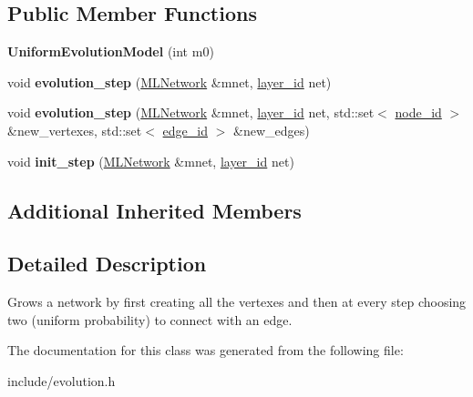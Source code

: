 \subsection*{Public Member Functions}
\begin{DoxyCompactItemize}
\item 
\hypertarget{classmlnet_1_1_uniform_evolution_model_a9686b3e7b297645a5864c6bf5bd167a3}{{\bfseries Uniform\+Evolution\+Model} (int m0)}\label{classmlnet_1_1_uniform_evolution_model_a9686b3e7b297645a5864c6bf5bd167a3}

\item 
\hypertarget{classmlnet_1_1_uniform_evolution_model_ae71cabef018c2465c0d1a54ff181002d}{void {\bfseries evolution\+\_\+step} (\hyperlink{classmlnet_1_1_m_l_network}{M\+L\+Network} \&mnet, \hyperlink{namespacemlnet_a84ad9c6056f0eb7d129995351f9b13fb}{layer\+\_\+id} net)}\label{classmlnet_1_1_uniform_evolution_model_ae71cabef018c2465c0d1a54ff181002d}

\item 
\hypertarget{classmlnet_1_1_uniform_evolution_model_ae29f442e24771508fe516eae962ae053}{void {\bfseries evolution\+\_\+step} (\hyperlink{classmlnet_1_1_m_l_network}{M\+L\+Network} \&mnet, \hyperlink{namespacemlnet_a84ad9c6056f0eb7d129995351f9b13fb}{layer\+\_\+id} net, std\+::set$<$ \hyperlink{namespacemlnet_a4c354f08ca868982bf3ddae882ff71c6}{node\+\_\+id} $>$ \&new\+\_\+vertexes, std\+::set$<$ \hyperlink{namespacemlnet_ad708e58e72680351e102e6b3d0489145}{edge\+\_\+id} $>$ \&new\+\_\+edges)}\label{classmlnet_1_1_uniform_evolution_model_ae29f442e24771508fe516eae962ae053}

\item 
\hypertarget{classmlnet_1_1_uniform_evolution_model_a9563111b1399676538324f847a114054}{void {\bfseries init\+\_\+step} (\hyperlink{classmlnet_1_1_m_l_network}{M\+L\+Network} \&mnet, \hyperlink{namespacemlnet_a84ad9c6056f0eb7d129995351f9b13fb}{layer\+\_\+id} net)}\label{classmlnet_1_1_uniform_evolution_model_a9563111b1399676538324f847a114054}

\end{DoxyCompactItemize}
\subsection*{Additional Inherited Members}


\subsection{Detailed Description}
Grows a network by first creating all the vertexes and then at every step choosing two (uniform probability) to connect with an edge. 

The documentation for this class was generated from the following file\+:\begin{DoxyCompactItemize}
\item 
include/evolution.\+h\end{DoxyCompactItemize}
